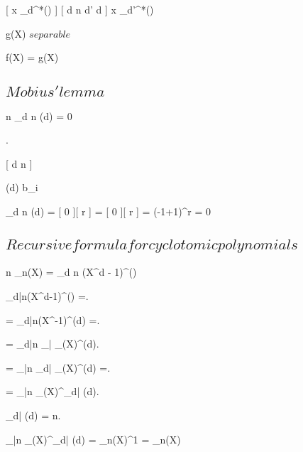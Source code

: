 \documentclass[a5paper]{book}
\begin{document}
{{{			[ x \in \mu_d^*(\C) ]
			{
				[ d \divides n \logicand d' \neq d ]
				{
					x \nin \mu_{d'}^*(\C)
				}
			}

			g(X) $ separable $
		}

		f(X) = g(X)
		
	}
	\newpage



	\subsection{ $ Mobius' lemma $ }
	
	{
		n \in \N
	}
	\proposition
	{
		\sum_{d \divides n } \mu(d) = 0
	}
	\demonstration
	{
		.

		[ d \divides n ]
		{

			\mu(d)  \ifandonlyif {}
			{
				b_i \in {}
			}
		}

		\sum_{d \divides n } \mu(d) = [ 0 ][ r ] = [ 0 ][ r ] = (-1+1)^r = 0
	}
	\newpage


	\subsection{ $ Recursive formula for cyclotomic polynomials $ }
	
	{
		n \in \N
	}
	\proposition
	{
		\Phi_n(X) = \prod_{d \divides n} (X^d - 1)^{\mu()}
	}
	\demonstration
	{
		\prod_{d|n}(X^d-1)^{\mu()} =.

		= \prod_{d|n}(X^{}-1)^{\mu(d)} =.

		= \prod_{d|n} \prod_{\delta|} \Phi_{\delta}(X)^{\mu(d)}.

		= \prod_{\delta|n} \prod_{d|} \Phi_{\delta}(X)^{\mu(d)} =.

		= \prod_{\delta|n} \Phi_{\delta}(X)^{\sum_{d|} \mu(d)}.

		\sum_{d|} \mu(d)  \ifandonlyif \delta = n.

		\prod_{\delta|n} \Phi_{\delta}(X)^{\sum_{d|} \mu(d)} = \Phi_n(X)^1 = \Phi_n(X)
	}
	\newpage

}
\end{document}

